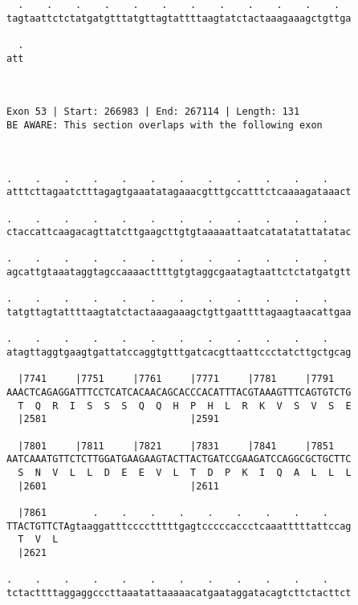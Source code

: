 \documentclass{article}
\begin{document}
\begin{Verbatim}
  .    .    .    .    .    .    .    .    .    .    .    .  
tagtaattctctatgatgtttatgttagtattttaagtatctactaaagaaagctgttga
                                                            
  .
att
   
   
 
Exon 53 | Start: 266983 | End: 267114 | Length: 131
BE AWARE: This section overlaps with the following exon



.    .    .    .    .    .    .    .    .    .    .    .    
atttcttagaatctttagagtgaaatatagaaacgtttgccatttctcaaaagataaact
                                                            
.    .    .    .    .    .    .    .    .    .    .    .    
ctaccattcaagacagttatcttgaagcttgtgtaaaaattaatcatatatattatatac
                                                            
.    .    .    .    .    .    .    .    .    .    .    .    
agcattgtaaataggtagccaaaacttttgtgtaggcgaatagtaattctctatgatgtt
                                                            
.    .    .    .    .    .    .    .    .    .    .    .    
tatgttagtattttaagtatctactaaagaaagctgttgaattttagaagtaacattgaa
                                                            
.    .    .    .    .    .    .    .    .    .    .    .    
atagttaggtgaagtgattatccaggtgtttgatcacgttaattccctatcttgctgcag
                                                            
  |7741     |7751     |7761     |7771     |7781     |7791   
AAACTCAGAGGATTTCCTCATCACAACAGCACCCACATTTACGTAAAGTTTCAGTGTCTG
  T  Q  R  I  S  S  S  Q  Q  H  P  H  L  R  K  V  S  V  S  E
  |2581                         |2591                       
  
  |7801     |7811     |7821     |7831     |7841     |7851   
AATCAAATGTTCTCTTGGATGAAGAAGTACTTACTGATCCGAAGATCCAGGCGCTGCTTC
  S  N  V  L  L  D  E  E  V  L  T  D  P  K  I  Q  A  L  L  L
  |2601                         |2611                       
  
  |7861        .    .    .    .    .    .    .    .    .    
TTACTGTTCTAgtaaggatttcccctttttgagtcccccaccctcaaatttttattccag
  T  V  L                                                   
  |2621                                                     
  
.    .    .    .    .    .    .    .    .    .    .    .    
tctacttttaggaggcccttaaatattaaaaacatgaataggatacagtcttctacttct
                                                            

\end{Verbatim}
\end{document}
